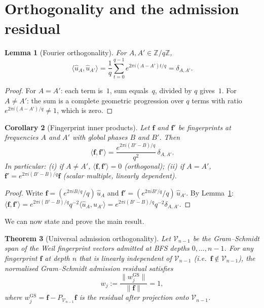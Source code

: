 \documentclass[11pt]{article}
\newtheorem{theorem}{Theorem}
\newtheorem{corollary}[theorem]{Corollary}
\newtheorem{lemma}[theorem]{Lemma}
\newcommand{\fp}{\mathbf{f}}
\newcommand{\ue}{\hat{u}}
\begin{document}
  \section{Orthogonality and the admission residual}
    \label{sec:orthogonality}

    \begin{lemma}[Fourier orthogonality]
      \label{lem:ortho}
      For $A,A'\in\mathbb{Z}/q\mathbb{Z}$,
      \[
        \langle \ue_A,\ue_{A'}\rangle
        = \frac{1}{q}\sum_{t=0}^{q-1}e^{2\pi i(A-A')t/q}
        = \delta_{A,A'}.
      \]
    \end{lemma}

    \begin{proof}
      For $A=A'$: each term is~$1$, sum equals~$q$, divided by $q$ gives~$1$.
      For $A\neq A'$: the sum is a complete geometric progression over $q$ terms with
      ratio $e^{2\pi i(A-A')/q}\neq 1$, which is zero.
    \end{proof}

    \begin{corollary}[Fingerprint inner products]
      \label{cor:fp-inner}
      Let $\fp$ and $\fp'$ be fingerprints at frequencies $A$ and $A'$ with global phases
      $B$ and $B'$. Then
      \[
        \langle\fp,\fp'\rangle = \frac{e^{2\pi i(B'-B)/q}}{q^2}\,\delta_{A,A'}.
      \]
      In particular: (i) if $A\neq A'$, $\langle\fp,\fp'\rangle=0$ (orthogonal);
      (ii) if $A=A'$, $\fp'=e^{2\pi i(B'-B)/q}\fp$ (scalar multiple, linearly dependent).
    \end{corollary}
    \begin{proof}
      Write $\fp=(e^{2\pi iB/q}/q)\,\ue_A$ and $\fp'=(e^{2\pi iB'/q}/q)\,\ue_{A'}$.
      By Lemma~\ref{lem:ortho}:
      $\langle\fp,\fp'\rangle = e^{2\pi i(B'-B)/q} q^{-2} \langle\ue_A,\ue_{A'}\rangle
      = e^{2\pi i(B'-B)/q} q^{-2}\delta_{A,A'}$.
    \end{proof}

    We can now state and prove the main result.

    \begin{theorem}[Universal admission orthogonality]
      \label{thm:main}
      Let $\mathcal{V}_{n-1}$ be the Gram--Schmidt span of the Weil fingerprint vectors
      admitted at BFS depths $0,\dots,n-1$.
      For any fingerprint $\fp$ at depth $n$ that is linearly independent of
      $\mathcal{V}_{n-1}$ (i.e.\ $\fp\notin\mathcal{V}_{n-1}$), the normalised
      Gram--Schmidt admission residual satisfies
      \[
        w_j := \frac{\|w^{\mathrm{GS}}_j\|}{\|\fp\|} = 1,
      \]
      where $w^{\mathrm{GS}}_j = \fp - P_{\mathcal{V}_{n-1}}\fp$ is the residual after
      projection onto $\mathcal{V}_{n-1}$.
    \end{theorem}
\end{document}
